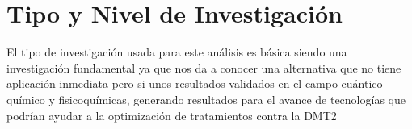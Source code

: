 \section{Tipo y Nivel de Investigación}
El tipo de investigación usada para este análisis es básica siendo una investigación fundamental ya que nos da a conocer una alternativa que no tiene aplicación inmediata pero si unos resultados validados en el campo cuántico químico y fisicoquímicas, generando resultados para el avance de tecnologías que podrían ayudar a la optimización de tratamientos contra la DMT2  


